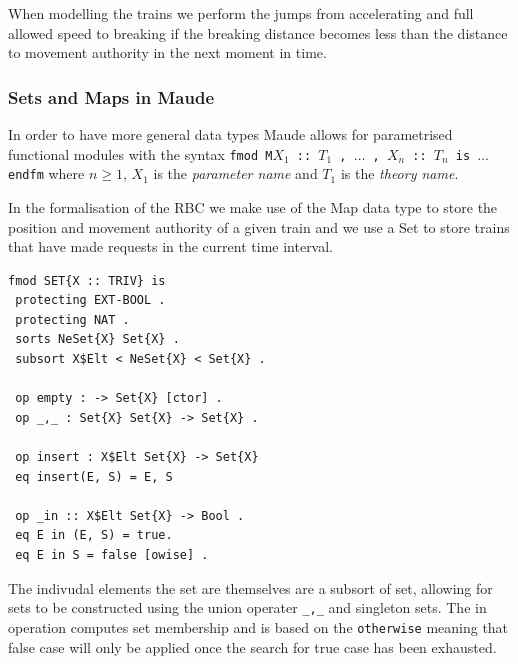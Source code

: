 When modelling the trains we perform the jumps from accelerating and full allowed speed to breaking if the breaking distance becomes less than the distance to movement authority in the next moment in time.


\subsubsection*{Sets and Maps in Maude}
In order to have more general data types Maude allows for parametrised functional modules with the  syntax \texttt{fmod M{$X_1$ :: $T_1$ , $\ldots$ , $X_n$ :: $T_n$} is $\ldots$ endfm} where $n \geq 1$, $X_1$ is the \emph{parameter name} and $T_1$ is the \emph{theory name}.

In the formalisation of the RBC we make use of the Map data type to store the position and movement authority of a given train and we use a Set to store trains that have made requests in the current time interval. 

\begin{lstlisting}[caption = The specification of the Set data type in Maude]
fmod SET{X :: TRIV} is 
 protecting EXT-BOOL .
 protecting NAT .
 sorts NeSet{X} Set{X} .
 subsort X$Elt < NeSet{X} < Set{X} .

 op empty : -> Set{X} [ctor] .
 op _,_ : Set{X} Set{X} -> Set{X} .
 
 op insert : X$Elt Set{X} -> Set{X}
 eq insert(E, S) = E, S

 op _in :: X$Elt Set{X} -> Bool .
 eq E in (E, S) = true.
 eq E in S = false [owise] .

\end{lstlisting}

The indivudal elements the set are themselves are a subsort of set, allowing for sets to be constructed using the union operater \texttt{\_,\_} and singleton sets. The in operation computes set membership and is based on the \texttt{otherwise}  meaning that false case will only be applied once the search for true case has been exhausted.


